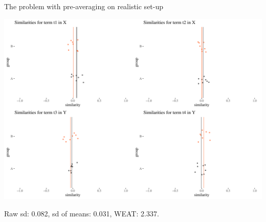 \documentclass[
  10pt,
  ignorenonframetext,
  x11names, dvipsnames, bibspacing,natbib, table]{beamer}
\begin{document}
\begin{frame}{The problem with pre-averaging on realistic set-up}
\protect\hypertarget{the-problem-with-pre-averaging-on-realistic-set-up}{}
\vspace{1mm}
\footnotesize

\begin{center}\includegraphics[width=0.95\linewidth]{presentationBoston_files/figure-beamer/unnamed-chunk-11-1} \end{center}

\footnotesize

\vspace{-2mm}

Raw sd: 0.082, sd of means: 0.031, WEAT: 2.337.
\end{frame}
\end{document}
